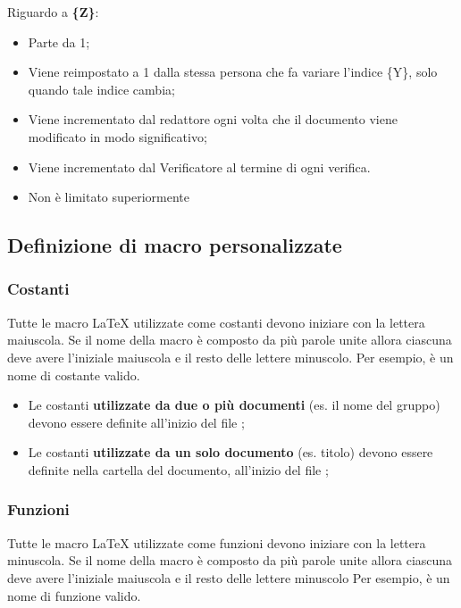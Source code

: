 Riguardo a \textbf{\{Z\}}:
\begin{itemize}
 \item Parte da 1;
 \item Viene reimpostato a 1 dalla stessa persona che fa variare l'indice \{Y\}, solo quando tale indice cambia;
 \item Viene incrementato dal redattore ogni volta che il documento viene modificato in modo significativo;
 \item Viene incrementato dal Verificatore al termine di ogni verifica.
 \item Non è limitato superiormente
\end{itemize}


\subsection{Definizione di macro personalizzate}

\subsubsection{Costanti}

Tutte le macro \LaTeX{} utilizzate come costanti devono iniziare con la lettera maiuscola. Se il nome della macro è composto da più parole unite allora ciascuna deve avere l'iniziale maiuscola e il resto delle lettere minuscolo. Per esempio,  è un nome di costante valido.

\begin{itemize}
	\item Le costanti \textbf{utilizzate da due o più documenti} (es. il nome del gruppo) devono essere definite all'inizio del file ;
	
	\item Le costanti \textbf{utilizzate da un solo documento} (es. titolo) devono essere definite nella cartella del documento, all'inizio del file ;
\end{itemize}
	
\subsubsection{Funzioni}

Tutte le macro \LaTeX{} utilizzate come funzioni devono iniziare con la lettera minuscola. Se il nome della macro è composto da più parole unite allora ciascuna deve avere l'iniziale maiuscola e il resto delle lettere minuscolo Per esempio,  è un nome di funzione valido.

